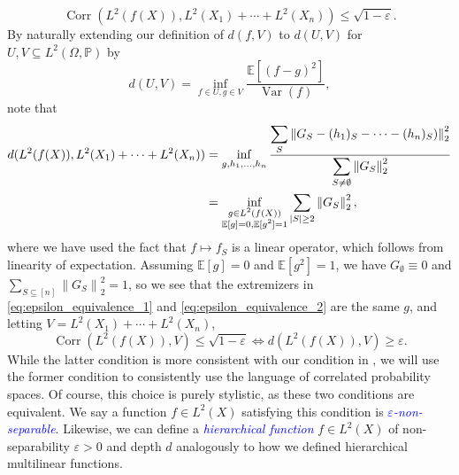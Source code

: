 \documentclass[12pt,letterpaper]{amsart}
\newcommand{\dfn}[1]{\textcolor{blue}{\emph{#1}}}
\def\E{\mathbb{E}}
\def\P{\mathbb{P}}
\def\Var{\operatorname{Var}}
\def\Corr{\operatorname{Corr}}
\newcommand{\norm}[1]{\left\lVert#1\right\rVert}
\newcommand{\abs}[1]{\left\lvert#1\right\rvert}
\newcommand{\1}[1]{1_{\left\{#1\right\}}}
\theoremstyle{definition}
\theoremstyle{remark}
\begin{document}
\[ \Corr(L^2(f(X)),L^2(X_1)+\cdots+L^2(X_n))\leq\sqrt{1-\varepsilon}. \]
By naturally extending our definition of $d(f,V)$ to $d(U,V)$ for $U,V\subseteq L^2(\Omega,\P)$ by
\[ d(U,V) = \inf_{f\in U,g\in V}\frac{\E[(f-g)^2]}{\Var(f)}, \]
note that
\begin{align}
    \notag
    d(L^2(f(X)),L^2(X_1)+\cdots+L^2(X_n))
    &= \inf_{g,h_1,\dots,h_n}\frac{\displaystyle\sum_{S}\norm{G_S-(h_1)_S-\cdots-(h_n)_S)}_2^2}{\displaystyle\sum_{S\neq\emptyset}\norm{G_S}_2^2}
    \\ &= \inf_{\substack{g\in L^2(f(X))\\\E[g]=0,\E[g^2]=1}}\displaystyle\sum_{\abs{S}\geq2}\norm{G_S}_2^2, \label{eq:epsilon_equivalence_2}
\end{align}
where we have used the fact that $f\mapsto f_S$ is a linear operator, which follows from linearity of expectation.
Assuming $\E[g]=0$ and $\E[g^2]=1$, we have $G_\emptyset\equiv0$ and $\sum_{S\subseteq[n]}\norm{G_S}_2^2=1$, so we see that the extremizers in \eqref{eq:epsilon_equivalence_1} and \eqref{eq:epsilon_equivalence_2} are the same $g$, and letting $V=L^2(X_1)+\cdots+L^2(X_n)$,
\begin{equation}\label{eq:epsilon_equivalence}
    \Corr(L^2(f(X)),V)\leq\sqrt{1-\varepsilon} \iff d(L^2(f(X)),V) \geq \varepsilon.
\end{equation}
While the latter condition is more consistent with our condition in , we will use the former condition to consistently use the language of correlated probability spaces.
Of course, this choice is purely stylistic, as these two conditions are equivalent.
We say a function $f\in L^2(X)$ satisfying this condition is \dfn{$\varepsilon$-non-separable}.
Likewise, we can define a \dfn{hierarchical function} $f\in L^2(X)$ of non-separability $\varepsilon>0$ and depth $d$ analogously to how we defined hierarchical multilinear functions.
\end{document}
